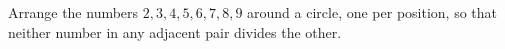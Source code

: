 Arrange the numbers $2,3,4,5,6,7,8,9$ around a circle, one per position, so that neither number in any adjacent pair divides the other.
